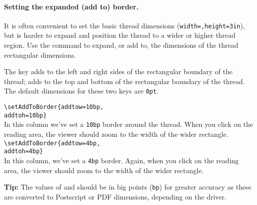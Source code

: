 \documentclass{article}
\begin{document}
\paragraph*{Setting the expanded (add to) border.} It is often convenient to
set the basic thread dimensions (\texttt{width=,height=3in}),
but is harder to expand and position the thread to a wider or higher thread
region. Use the  command to expand, or add to, the
dimensions of the thread rectangular dimensions.
\bVerb{}%
\begin{dCmd}[commandchars=!()]{\bxSize}
\end{dCmd}
\endgroup\noindent The  key adds  to the left and right
sides of the rectangular boundary of the thread;  adds
 to the top and bottom of the rectangular boundary of the
thread. The default dimensions for these two keys are \texttt{0pt}.
\begin{multicols}{2}%
\noindent{}\previewOn\viewMagWinOn
{\small\verb|\setAddToBorder{addtow=10bp,|\\
\null\quad\verb|addtoh=10bp}|}\\%
In this column we've set a \texttt{10bp} border around the thread. When you click
on the reading area, the viewer should zoom to the width of the wider rectangle.
\vfill
\columnbreak
\noindent{}\previewOn\viewMagWinOn
{\small\verb|\setAddToBorder{addtow=4bp,|\\
\null\quad\verb|addtoh=4bp}|}\\%
In this column, we've set a \texttt{4bp} border. Again, when you click on the
reading area, the viewer should zoom to the width of the wider rectangle.
\end{multicols}
\newtopic\noindent\textbf{Tip:} The values of  and  should be in big
points (\texttt{bp}) for greater accuracy as these are converted to
Postscript or PDF dimensions, depending on the driver.
\end{document}
